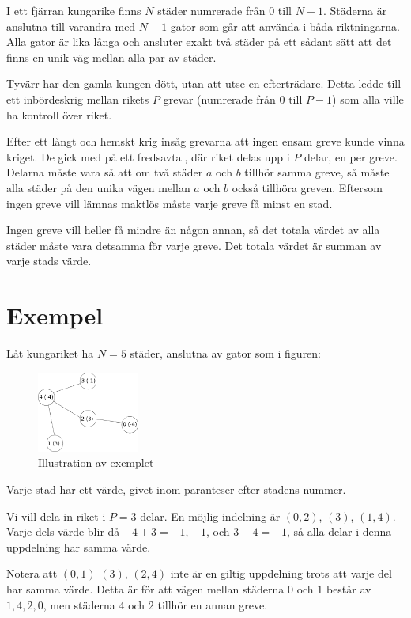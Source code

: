 \newcommand\version{v2}
I ett fjärran kungarike finns $N$ städer numrerade från $0$ till $N-1$.
Städerna är anslutna till varandra med $N-1$ gator som går att använda i båda riktningarna.
Alla gator är lika långa och ansluter exakt två städer på ett sådant sätt att det finns en unik väg mellan alla par av städer.

Tyvärr har den gamla kungen dött, utan att utse en efterträdare. Detta ledde till ett inbördeskrig mellan rikets $P$ grevar (numrerade från $0$ till $P - 1$) som alla ville ha kontroll över riket.

Efter ett långt och hemskt krig insåg grevarna att ingen ensam greve kunde vinna kriget. De gick med på ett fredsavtal, där riket delas upp i $P$ delar, en per greve. Delarna måste vara så att om två städer $a$ och $b$ tillhör samma greve, så måste alla städer på den unika vägen mellan $a$ och $b$ också tillhöra greven. Eftersom ingen greve vill lämnas maktlös måste varje greve få minst en stad.

Ingen greve vill heller få mindre än någon annan, så det totala värdet av alla städer måste vara detsamma för varje greve. Det totala värdet är summan av varje stads värde.

\section*{Exempel}
Låt kungariket ha $N = 5$ städer, anslutna av gator som i figuren:
\begin{figure}[h!]
  \centering
  \includegraphics[width=0.3\textwidth]{sample.png}
  \caption{Illustration av exemplet}
\end{figure}
Varje stad har ett värde, givet inom paranteser efter stadens nummer.

Vi vill dela in riket i $P = 3$ delar.
En möjlig indelning är $(0, 2)$, $(3)$, $(1, 4)$.
Varje dels värde blir då $-4 + 3 = -1$, $-1$, och $3 - 4 = -1$,
så alla delar i denna uppdelning har samma värde.

Notera att $(0, 1)$ $(3)$, $(2, 4)$ inte är en giltig uppdelning trots att varje del har samma värde.
Detta är för att vägen mellan städerna $0$ och $1$ består av $1, 4, 2, 0$, men städerna $4$ och $2$ tillhör en annan greve.

